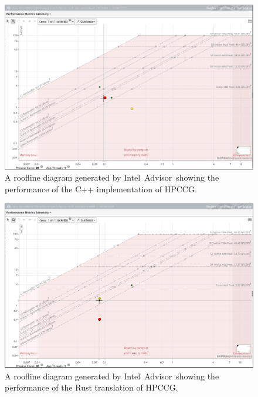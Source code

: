 \begin{figure}[H]
    \centering
    \includegraphics[width=\textwidth]{images/5_performance/rooflines/cpp_roofline.png}
    \caption{A roofline diagram generated by Intel\textregistered\ Advisor\ showing the performance of the C++ implementation of HPCCG.}
    \label{fig:cpp-roofline}
\end{figure}

\begin{figure}[H]
    \centering
    \includegraphics[width=\textwidth]{images/5_performance/rooflines/rust_roofline.png}
    \caption{A roofline diagram generated by Intel\textregistered\ Advisor\ showing the performance of the Rust translation of HPCCG.}
    \label{fig:rust-roofline}
\end{figure}

